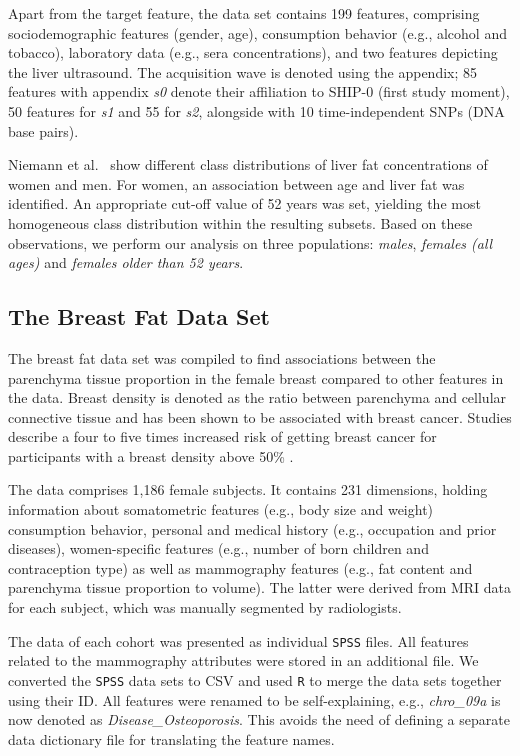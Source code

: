 \documentclass[journal]{style/vgtc} 			          %
\begin{document}
Apart from the target feature, the data set contains 199 features, comprising sociodemographic features (gender, age), consumption behavior (e.g., alcohol and tobacco), laboratory data (e.g., sera concentrations), and two features depicting the liver ultrasound.
The acquisition wave is denoted using the appendix; 85 features with appendix \emph{s0} denote their affiliation to SHIP-0 (first study moment), 50 features for \emph{s1} and 55 for \emph{s2}, alongside with 10 time-independent SNPs (DNA base pairs).

Niemann et al.~\cite{Niemann2014} show different class distributions of liver fat concentrations of women and men.
For women, an association between age and liver fat was identified.
An appropriate cut-off value of 52 years was set, yielding the most homogeneous class distribution within the resulting subsets.
Based on these observations, we perform our analysis on three populations: \emph{males}, \emph{females (all ages)} and \emph{females older than 52 years}.
\subsection{The Breast Fat Data Set}
The breast fat data set was compiled to find associations between the parenchyma tissue proportion in the female breast compared to other features in the data.
Breast density is denoted as the ratio between parenchyma and cellular connective tissue and has been shown to be associated with breast cancer.
Studies describe a four to five times increased risk of getting breast cancer for participants with a breast density above 50\% \cite{Mccormack2006}.

The data comprises 1,186 female subjects. %
It contains 231 dimensions, holding information about somatometric features (e.g., body size and weight) consumption behavior, personal and medical history (e.g., occupation and prior diseases), women-specific features (e.g., number of born children and contraception type) as well as mammography features (e.g., fat content and parenchyma tissue proportion to volume).
The latter were derived from MRI data for each subject, which was manually segmented by radiologists.

The data of each cohort was presented as individual \texttt{SPSS} files.
All features related to the mammography attributes were stored in an additional file.
We converted the \texttt{SPSS} data sets to CSV and used \texttt{R} to merge the data sets together using their ID.
All features were renamed to be self-explaining, e.g., \emph{chro\_09a} is now denoted as \emph{Disease\_Osteoporosis}.
This avoids the need of defining a separate data dictionary file for translating the feature names.
\end{document}

